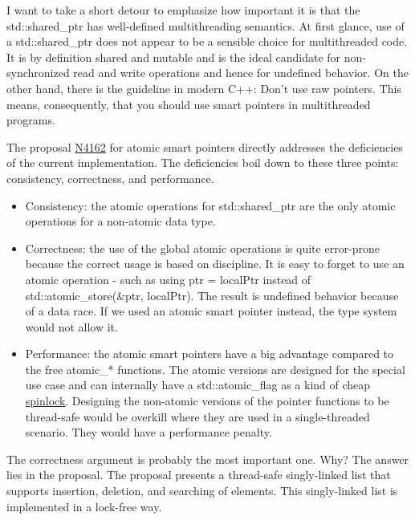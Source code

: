 \begin{tcolorbox}[breakable,enhanced jigsaw,colback=blue!5!white,colframe=blue!75!black,title={The Importance of being Thread-Safe}]
	
I want to take a short detour to emphasize how important it is that the std::shared\_ptr has well-defined multithreading semantics. At first glance, use of a std::shared\_ptr does not appear to be a sensible choice for multithreaded code. It is by definition shared and mutable and is the ideal candidate for non-synchronized read and write operations and hence for undefined behavior. On the other hand, there is the guideline in modern C++: Don’t use raw pointers. This means, consequently, that you should use smart pointers in multithreaded programs.
	
\end{tcolorbox}

The proposal \href{http://wg21.link/n4162}{N4162} for atomic smart pointers directly addresses the deficiencies of the current implementation. The deficiencies boil down to these three points: consistency, correctness, and performance.

\begin{itemize}
\item 
Consistency: the atomic operations for std::shared\_ptr are the only atomic operations for a non-atomic data type.

\item 
Correctness: the use of the global atomic operations is quite error-prone because the correct usage is based on discipline. It is easy to forget to use an atomic operation - such as using ptr = localPtr instead of std::atomic\_store(\&ptr, localPtr). The result is undefined behavior because of a data race. If we used an atomic smart pointer instead, the type system would not allow it.

\item 
Performance: the atomic smart pointers have a big advantage compared to the free atomic\_* functions. The atomic versions are designed for the special use case and can internally have a std::atomic\_flag as a kind of cheap \href{https://en.wikipedia.org/wiki/Spinlock}{spinlock}. Designing the non-atomic versions of the pointer functions to be thread-safe would be overkill where they are used in a single-threaded scenario. They would have a performance penalty.
\end{itemize}

The correctness argument is probably the most important one. Why? The answer lies in the proposal. The proposal presents a thread-safe singly-linked list that supports insertion, deletion, and searching of elements. This singly-linked list is implemented in a lock-free way.

